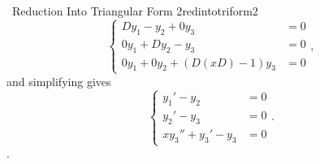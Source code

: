 \begin{example}{\Difficulty\,\Difficulty\,\,Reduction Into Triangular Form 2}{redintotriform2}
            \begin{equation*}
                \begin{cases}
                    Dy_1-y_2+0y_3&=0 \\
                    0y_1+Dy_2-y_3&=0 \\
                    0y_1+0y_2+(D(xD)-1)y_3&=0
                \end{cases},
            \end{equation*}
            and simplifying gives
            \begin{equation*}
                \begin{cases}
                    y_1'-y_2&=0 \\
                    y_2'-y_3&=0 \\
                    xy_3''+y_3'-y_3&=0
                \end{cases}.
            \end{equation*}.
        \end{example}
